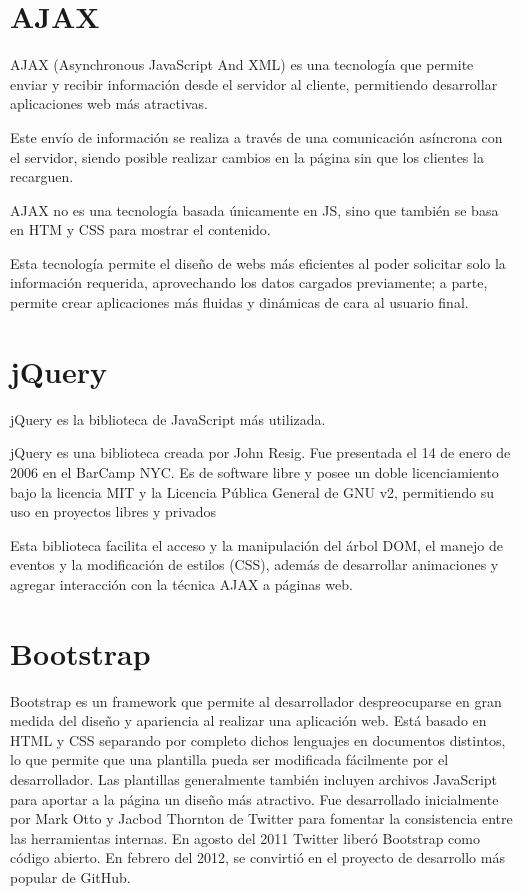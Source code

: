 \section{AJAX} 
\label{sec:ajax}


AJAX (Asynchronous JavaScript And XML) es una tecnología que permite enviar y recibir información desde el servidor al cliente, permitiendo desarrollar aplicaciones web más atractivas.


Este envío de información se realiza a través de una comunicación asíncrona con el servidor, siendo posible realizar cambios en la página sin que los clientes la recarguen.


AJAX no es una tecnología basada únicamente en JS, sino que también se basa en HTM y CSS para mostrar el contenido.


Esta tecnología permite el diseño de webs más eficientes al poder solicitar solo la información requerida, aprovechando los datos cargados previamente; a parte, permite crear aplicaciones más fluidas y dinámicas de cara al usuario final.

\section{jQuery} 
\label{sec:jquery}

jQuery es la biblioteca de JavaScript más utilizada. 


jQuery es una biblioteca creada por John Resig. Fue presentada el 14 de enero de 2006 en el BarCamp NYC. Es de software libre y posee un doble licenciamiento bajo la licencia MIT y la Licencia Pública General de GNU v2, permitiendo su uso en proyectos libres y privados


Esta biblioteca facilita el acceso y la manipulación del árbol DOM, el manejo de eventos y la modificación de estilos (CSS), además de desarrollar animaciones y agregar interacción con la técnica AJAX a páginas web.


\section{Bootstrap} 
\label{sec:bootstrap}


Bootstrap es un framework que permite al desarrollador despreocuparse en gran medida del diseño y apariencia al realizar una aplicación web. Está basado en HTML y CSS separando por completo dichos lenguajes en documentos distintos, lo que permite que una plantilla pueda ser modificada fácilmente por el desarrollador. Las plantillas generalmente también incluyen archivos JavaScript para aportar a la página un diseño más atractivo.
Fue desarrollado inicialmente por Mark Otto y Jacbod Thornton de Twitter para fomentar la consistencia entre las herramientas internas.  En agosto del 2011 Twitter liberó Bootstrap como código abierto. En febrero del 2012, se convirtió en el proyecto de desarrollo más popular de GitHub.


